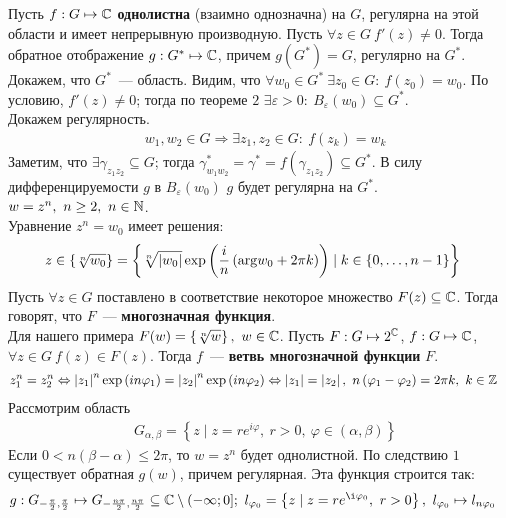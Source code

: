 Пусть $f: G \mapsto \mathbb{C}$ \textbf{однолистна} (взаимно однозначна) на $G$,
регулярна на этой области и имеет непрерывную производную. Пусть $\forall z \in
G \ f'(z) \neq 0$. Тогда обратное отображение $g: G^* \mapsto \mathbb{C}$, причем
$g(G^*) = G$, регулярно на $G^*$.
\pr
Докажем, что $G^*$~--- область. Видим, что $\forall w_0 \in G^* \ \exists z_0
\in G: \ f(z_0) = w_0$. По условию, $f'(z) \neq 0$; тогда по теореме $2$
$\exists \varepsilon > 0: \ B_\varepsilon(w_0) \subseteq G^*$.
\\
Докажем регулярность.
\begin{align*}
  & w_1, w_2 \in G \Rightarrow \exists z_1, z_2 \in G: \ f(z_k) = w_k
\end{align*}
Заметим, что $\exists \gamma_{z_1z_2} \subseteq G$; тогда $\gamma_{w_1w_2}^* =
\gamma^* = f(\gamma_{z_1z_2}) \subseteq G^*$.
В силу дифференцируемости $g$ в $B_\varepsilon(w_0)$ $g$ будет регулярна на
$G^*$.
\Example
$w = z^n, \ n \geq 2, \ n \in \mathbb{N}$.
\\
Уравнение $z^n = w_0$ имеет решения:
\begin{align*}
  & z \in \left\{ \sqrt[n]{w_0} \right\} = \left\{ \sqrt[n]{\left| w_0 \right|} \exp \left( \displaystyle \frac{i}{n}\left( \mathrm{arg} w_0 + 2 \pi k \right) \right) \mid k \in \left\{0, \dots, n-1 \right\} \right\}
\end{align*}
\Def
Пусть $\forall z \in G$ поставлено в соответствие некоторое множество $F(z)
\subseteq \mathbb{C}$. Тогда говорят, что $F$~--- \textbf{многозначная функция}.
\\
Для нашего примера $F(w) = \left\{ \sqrt[n]{w} \right\}, \ w \in \mathbb{C}$.
\Def
Пусть $F: G \mapsto 2^{\mathbb{C}}$, $f: G \mapsto \mathbb{C}$, $\forall z \in G \ f(z)\in
F(z)$. Тогда $f$~--- \textbf{ветвь многозначной функции} $F$.
\example
\begin{align*}
  & z_1^n = z_2^n \Leftrightarrow \left| z_1 \right|^n \exp \left( in\varphi_1 \right) = \left| z_2 \right|^n \exp \left( in\varphi_2 \right) \Leftrightarrow \left| z_1 \right| = \left|z_2\right|, \ n\left( \varphi_1 - \varphi_2 \right) = 2 \pi k, \ k \in \mathbb{Z}
\end{align*}
Рассмотрим область
\begin{align*}
  & G_{\alpha, \beta} = \left\{ z \mid z = re^{i \varphi}, \ r>0, \ \varphi \in \left( \alpha, \beta \right) \right\}
\end{align*}
Если $0 < n(\beta - \alpha) \leq 2 \pi$, то $w = z^n$ будет однолистной. По
следствию $1$ существует обратная $g(w)$, причем регулярная. Эта функция
строится так:
\begin{align*}
  & g: G_{-\frac{\pi}{2}, \frac{\pi}{2}} \mapsto G_{-\frac{n\pi}{2}, \frac{n\pi}{2}} \subseteq \CC \setminus (-\infty; 0]; \ l_{\varphi_0} = \left\{ z \mid z = re^{\i \varphi_0}, \ r > 0 \right\}, \ l_{\varphi_0} \mapsto l_{n \varphi_0}
\end{align*}
